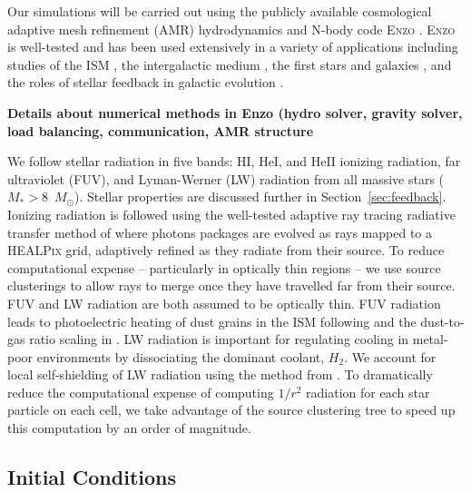 \documentclass[12pt]{article} %
\begin{document}
Our simulations will be carried out using the publicly available cosmological adaptive mesh refinement (AMR) hydrodynamics and N-body code \textsc{Enzo} \citep{Enzo2014,Enzo2019}. \textsc{Enzo} is well-tested and has been used extensively in a variety of applications including studies of the ISM \citep{Slyz2005,TaskerBryan2008}, the intergalactic medium \citep{BryanMachacek2000,FangBryan2001}, the first stars and galaxies \citep{Wise2012a}, and the roles of stellar feedback in galactic evolution \citep{}.

\textbf{Details about numerical methods in Enzo (hydro solver, gravity solver, load balancing, communication, AMR structure}

We follow stellar radiation in five bands: HI, HeI, and HeII ionizing radiation, far ultraviolet (FUV), and Lyman-Werner (LW) radiation from all massive stars ($M_* > 8$~$M_{\odot}$). Stellar properties are discussed further in Section~\ref{sec:feedback}. Ionizing radiation is followed using the well-tested adaptive ray tracing radiative transfer method of \citep{WiseAbel2011} where photons packages are evolved as rays mapped to a \textsc{HEALPix} grid, adaptively refined as they radiate from their source. To reduce computational expense -- particularly in optically thin regions -- we use source clusterings to allow rays to merge once they have travelled far from their source. FUV and LW radiation are both assumed to be optically thin. FUV radiation leads to photoelectric heating of dust grains in the ISM following \cite{Wolfire2003} and the dust-to-gas ratio scaling in \cite{Remy-Ruyer2014}. LW radiation is important for regulating cooling in metal-poor environments by dissociating the dominant coolant, $H_2$. We account for local self-shielding of LW radiation using the method from \cite{Wolcott-Green2011}. To dramatically reduce the computational expense of computing $1/r^2$ radiation for each star particle on each cell, we take advantage of the source clustering tree to speed up this computation by an order of magnitude. 

\subsection{Initial Conditions}
\end{document}
